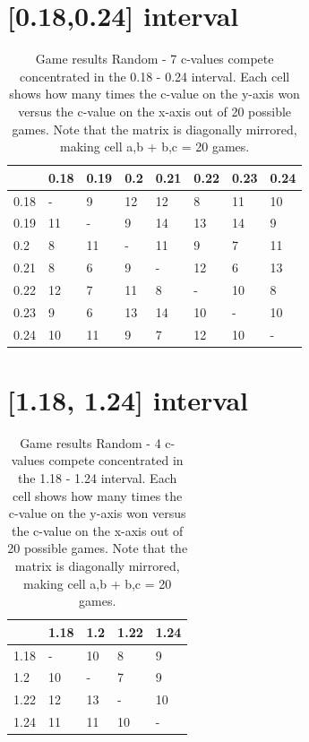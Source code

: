 \documentclass[
11pt, %
english, %
singlespacing, %
headsepline, %
]{MastersDoctoralThesis} %
\begin{document}
\begin{appendices}
\section{[0.18,0.24] interval}
\begin{table}[H]
	\centering
	\begin{tabular}{|l||l|l|l|l|l|l|l|}
		\hline
		     & 0.18 & 0.19 & 0.2 & 0.21 & 0.22 & 0.23 & 0.24    \\ \hline \hline
		0.18 & -    & 9   & 12   & 12   & 8    & 11   & 10 \\ \hline
		0.19 & 11   & -   & 9    & 14   & 13   & 14   & 9  \\ \hline
		0.2  & 8    & 11  & -    & 11   & 9    & 7    & 11 \\ \hline
		0.21 & 8    & 6   & 9    & -    & 12   & 6    & 13 \\ \hline
		0.22 & 12   & 7   & 11   & 8    & -    & 10   & 8  \\ \hline
		0.23 & 9    & 6   & 13   & 14   & 10   & -    & 10 \\ \hline
		0.24 & 10   & 11  & 9    & 7    & 12   & 10   & -  \\ \hline
	\end{tabular}
		\caption{Game results Random - 7 c-values compete concentrated in the 0.18 - 0.24 interval. Each cell shows how many times the c-value on the y-axis won versus the c-value on the x-axis out of 20 possible games. Note that the matrix is diagonally mirrored, making cell a,b + b,c = 20 games.}
		\label{table:ranking-matrix-random-narrow}
\end{table}

\section{[1.18, 1.24] interval}
\begin{table}[H]
	\centering
	\begin{tabular}{|l||l|l|l|l|}
		\hline
		& 1.18 & 1.2 & 1.22 & 1.24 \\ \hline\hline
		1.18 & -     & 10  & 8    & 9    \\ \hline
		1.2  & 10   & -   & 7    & 9    \\ \hline
		1.22 & 12   & 13  & -    & 10   \\ \hline
		1.24 & 11   & 11  & 10   & -    \\ \hline
	\end{tabular}
	\caption{Game results Random - 4 c-values compete concentrated in the 1.18 - 1.24 interval. Each cell shows how many times the c-value on the y-axis won versus the c-value on the x-axis out of 20 possible games. Note that the matrix is diagonally mirrored, making cell a,b + b,c = 20 games.}
	\label{table:ranking-matrix-random-narrow2}
\end{table}



\end{appendices}
\end{document}
